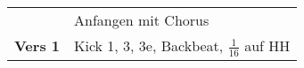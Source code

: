 
\begin{tabular}{p{1.6cm}l}
	                & Anfangen mit Chorus                            \\
	\textbf{Vers 1} & Kick 1, 3, 3e, Backbeat, $\frac{1}{16}$ auf HH \\
\end{tabular}
